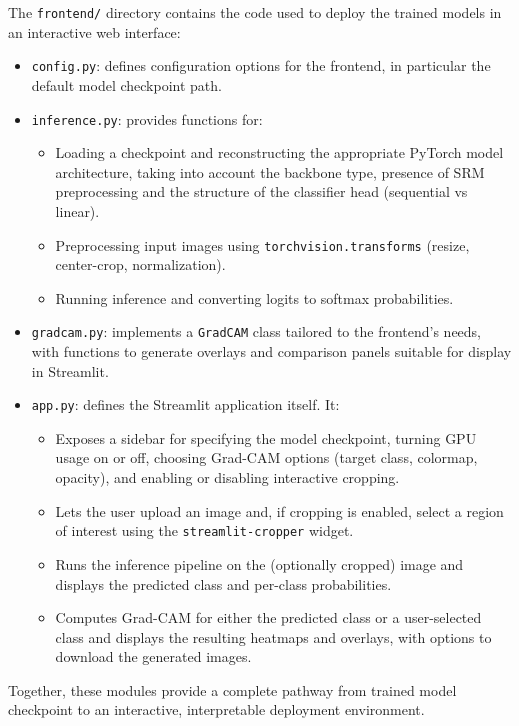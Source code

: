 The \texttt{frontend/} directory contains the code used to deploy the trained models in an interactive web interface:
\begin{itemize}
  \item \texttt{config.py}: defines configuration options for the frontend, in particular the default model checkpoint path.
  \item \texttt{inference.py}: provides functions for:
  \begin{itemize}
    \item Loading a checkpoint and reconstructing the appropriate PyTorch model architecture, taking into account the backbone type, presence of SRM preprocessing and the structure of the classifier head (sequential vs linear).
    \item Preprocessing input images using \texttt{torchvision.transforms} (resize, center-crop, normalization).
    \item Running inference and converting logits to softmax probabilities.
  \end{itemize}
  \item \texttt{gradcam.py}: implements a \texttt{GradCAM} class tailored to the frontend's needs, with functions to generate overlays and comparison panels suitable for display in Streamlit.
  \item \texttt{app.py}: defines the Streamlit application itself. It:
  \begin{itemize}
    \item Exposes a sidebar for specifying the model checkpoint, turning GPU usage on or off, choosing Grad-CAM options (target class, colormap, opacity), and enabling or disabling interactive cropping.
    \item Lets the user upload an image and, if cropping is enabled, select a region of interest using the \texttt{streamlit-cropper} widget.
    \item Runs the inference pipeline on the (optionally cropped) image and displays the predicted class and per-class probabilities.
    \item Computes Grad-CAM for either the predicted class or a user-selected class and displays the resulting heatmaps and overlays, with options to download the generated images.
  \end{itemize}
\end{itemize}

Together, these modules provide a complete pathway from trained model checkpoint to an interactive, interpretable deployment environment.


